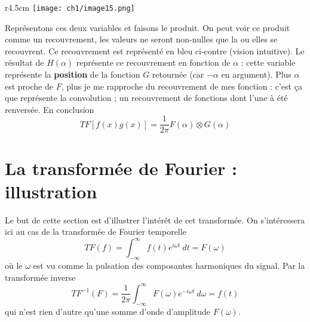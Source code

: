\begin{wrapfigure}[8]{r}{4.5cm}
\vspace{-6mm}
\texttt{[image: ch1/image15.png]}
\end{wrapfigure}
Représentons ces deux variables et faisons le produit. On peut voir ce produit comme un 
recouvrement, les valeurs ne seront non-nulles que la ou elles se recouvrent. Ce recouvrement 
est représenté en bleu ci-contre (vision intuitive). Le résultat de $H(\alpha)$ représente 
ce recouvrement en fonction de $\alpha$ : cette variable représente la \textbf{position} de la
fonction $G$ retournée (car $-\alpha$ en argument). Plus $\alpha$ est proche de $F$, plus 
je me rapproche du recouvrement de mes fonction : c'est ça que représente la convolution ; un 
recouvrement de fonctions dont l'une à été renversée. En conclusion
\begin{equation}
TF[f(x)g(x)] = \frac{1}{2\pi}F(\alpha)\otimes G(\alpha)
\end{equation}














\newpage
\section{La transformée de Fourier : illustration}
Le but de cette section est d'illustrer l'intérêt de cet transformée. On s'intéressera 
ici au cas de la transformée de Fourier temporelle
\begin{equation}
TF(f) = \int_{-\infty}^\infty f(t)e^{i\omega t}\ dt = F(\omega)
\end{equation}
où le $\omega$ est vu comme la pulsation des composantes harmoniques du signal. Par la 
transformée inverse
\begin{equation}
TF^{-1}(F) = \dfrac{1}{2\pi}\int_{-\infty}^\infty F(\omega)e^{-i\omega t }\ d\omega = f(t)
\end{equation}
qui n'est rien d'autre qu'une somme d'onde d'amplitude $F(\omega)$.\\

